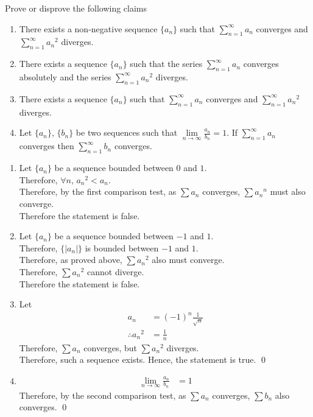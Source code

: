 \documentclass[fleqn, a4paper, 12pt, oneside]{amsart}
\theoremstyle{definition}
\theoremstyle{theorem}
\begin{document}
\begin{question}
	Prove or disprove the following claims
	\begin{enumerate}[label=(\alph*)]
		\item There exists a non-negative sequence $\{a_n\}$ such that $\sum\limits_{n = 1}^{\infty} a_n$ converges and $\sum\limits_{n = 1}^{\infty} {a_n}^2$ diverges.
		\item There exists a sequence $\{a_n\}$ such that the series $\sum\limits_{n = 1}^{\infty} a_n$ converges absolutely and the series $\sum\limits_{n = 1}^{\infty} {a_n}^2$ diverges.
		\item There exists a sequence $\{a_n\}$ such that $\sum\limits_{n = 1}^{\infty} a_n$ converges and $\sum\limits_{n = 1}^{\infty} {a_n}^2$ diverges.
		\item 
			Let $\{a_n\}$, $\{b_n\}$ be two sequences such that $\lim\limits_{n \to \infty} \frac{a_n}{b_n} = 1$.
			If $\sum\limits_{n = 1}^{\infty} a_n$ converges then $\sum\limits_{n = 1}^{\infty} b_n$ converges.
	\end{enumerate}
\end{question}

\begin{solution}
	\begin{enumerate}[label=(\alph*), leftmargin=*]
		\item 
			Let $\{a_n\}$ be a sequence bounded between $0$ and $1$.\\
			Therefore, $\forall n$, ${a_n}^2 < a_n$.\\
			Therefore, by the first comparison test, as $\sum a_n$ converges, $\sum {a_n}^n$ must also converge.\\
			Therefore the statement is false.
		\item
			Let $\{a_n\}$ be a sequence bounded between $-1$ and $1$.\\
			Therefore, $\{|a_n|\}$ is bounded between $-1$ and $1$.\\
			Therefore, as proved above, $\sum {a_n}^2$ also must converge.\\
			Therefore, $\sum {a_n}^2$ cannot diverge.\\
			Therefore the statement is false.
		\item
			Let
			\begin{align*}
				a_n                & = (-1)^n \frac{1}{\sqrt{n}} \\
				\therefore {a_n}^2 & = \frac{1}{n}
			\end{align*}
			Therefore, $\sum a_n$ converges, but $\sum {a_n}^2$ diverges.\\
			Therefore, such a sequence exists.
			Hence, the statement is true.
			\qed
		\item
			\begin{align*}
				\lim\limits_{n \to \infty} \frac{a_n}{b_n} & = 1
			\end{align*}
			Therefore, by the second comparison test, as $\sum a_n$ converges, $\sum b_n$ also converges.
			\qed
	\end{enumerate}
\end{solution}
\end{document}
